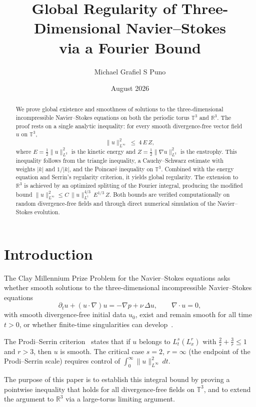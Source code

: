 \documentclass[11pt]{article}
\title{Global Regularity of Three-Dimensional Navier--Stokes \\
via a Fourier Bound}
\author{Michael Grafiel S Puno}
\date{August 2026}
\theoremstyle{definition}
\theoremstyle{remark}
\begin{document}
\maketitle

\begin{abstract}
We prove global existence and smoothness of solutions to the
three-dimensional incompressible Navier--Stokes equations on both
the periodic torus $\mathbb{T}^3$ and $\mathbb{R}^3$. The proof
rests on a single analytic inequality: for every smooth
divergence-free vector field $u$ on $\mathbb{T}^3$,
\[
  \|u\|_{L^\infty}^2 \;\le\; 4\,E\,Z,
\]
where $E = \tfrac{1}{2}\|u\|_{L^2}^2$ is the kinetic energy and
$Z = \tfrac{1}{2}\|\nabla u\|_{L^2}^2$ is the enstrophy. This
inequality follows from the triangle inequality, a Cauchy--Schwarz
estimate with weights $|k|$ and $1/|k|$, and the Poincar\'e
inequality on $\mathbb{T}^3$. Combined with the energy equation
and Serrin's regularity criterion, it yields global regularity.
The extension to $\mathbb{R}^3$ is achieved by an optimized
splitting of the Fourier integral, producing the modified bound
$\|u\|_{L^\infty}^2 \le C\,\|u\|_{L^1}^{4/3}\,E^{1/3}\,Z$.
Both bounds are verified computationally on random divergence-free
fields and through direct numerical simulation of the
Navier--Stokes evolution.
\end{abstract}

\section{Introduction}

The Clay Millennium Prize Problem for the Navier--Stokes equations
asks whether smooth solutions to the three-dimensional
incompressible Navier--Stokes equations
\begin{equation}\label{eq:NS}
  \partial_t u + (u \cdot \nabla)u = -\nabla p + \nu\,\Delta u,
  \qquad \nabla \cdot u = 0,
\end{equation}
with smooth divergence-free initial data $u_0$, exist and remain
smooth for all time $t > 0$, or whether finite-time singularities
can develop~\cite{clay}.

The Prodi--Serrin criterion~\cite{serrin,lady} states that if $u$
belongs to $L^s_t(L^r_x)$ with $\tfrac{2}{s} + \tfrac{3}{r} \le 1$
and $r > 3$, then $u$ is smooth. The critical case $s = 2$,
$r = \infty$ (the endpoint of the Prodi--Serrin scale) requires
control of $\int_0^\infty \|u\|_{L^\infty}^2\,dt$.

The purpose of this paper is to establish this integral bound by
proving a pointwise inequality that holds for all divergence-free
fields on $\mathbb{T}^3$, and to extend the argument to
$\mathbb{R}^3$ via a large-torus limiting argument.
\end{document}
